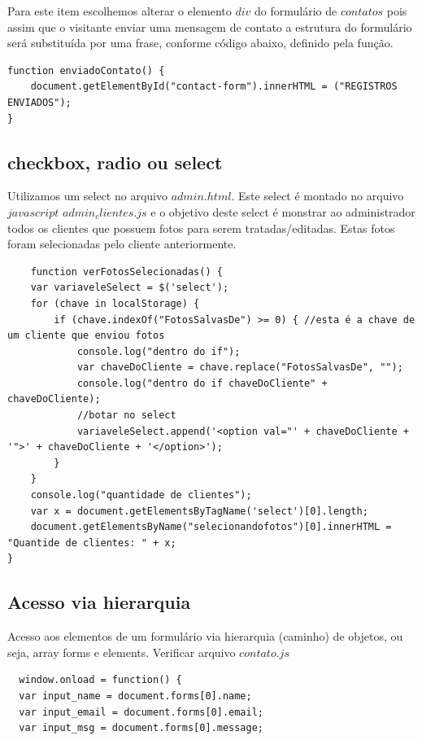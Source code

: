 	Para este item escolhemos alterar o elemento $div$ do formulário de $contatos$ pois assim que o visitante enviar uma mensagem de contato a estrutura do formulário será substituída por uma frase, conforme código abaixo, definido pela função.

\begin{lstlisting}
function enviadoContato() {
    document.getElementById("contact-form").innerHTML = ("REGISTROS ENVIADOS");
}
\end{lstlisting}


\subsection{checkbox, radio ou select}
	Utilizamos um select no arquivo $admin.html$. Este select é montado no arquivo $javascript$ $admin_clientes.js$ e o objetivo deste select é monstrar ao administrador todos os clientes que possuem fotos para serem tratadas/editadas. Estas fotos foram selecionadas pelo cliente anteriormente.
\begin{lstlisting}	
	function verFotosSelecionadas() {
    var variaveleSelect = $('select');
    for (chave in localStorage) {
        if (chave.indexOf("FotosSalvasDe") >= 0) { //esta é a chave de um cliente que enviou fotos
            console.log("dentro do if");
            var chaveDoCliente = chave.replace("FotosSalvasDe", "");
            console.log("dentro do if chaveDoCliente" + chaveDoCliente);
            //botar no select
            variaveleSelect.append('<option val="' + chaveDoCliente + '">' + chaveDoCliente + '</option>');
        }
    }
    console.log("quantidade de clientes");
    var x = document.getElementsByTagName('select')[0].length;
    document.getElementsByName("selecionandofotos")[0].innerHTML = "Quantide de clientes: " + x;
}

\end{lstlisting}
\subsection{Acesso via hierarquia}
	Acesso aos elementos de um formulário via hierarquia (caminho) de objetos, ou seja, array forms e elements.
 Verificar arquivo $contato.js$
	
 \begin{lstlisting}
  window.onload = function() {
  var input_name = document.forms[0].name;
  var input_email = document.forms[0].email;
  var input_msg = document.forms[0].message;

  
 \end{lstlisting}	
	

